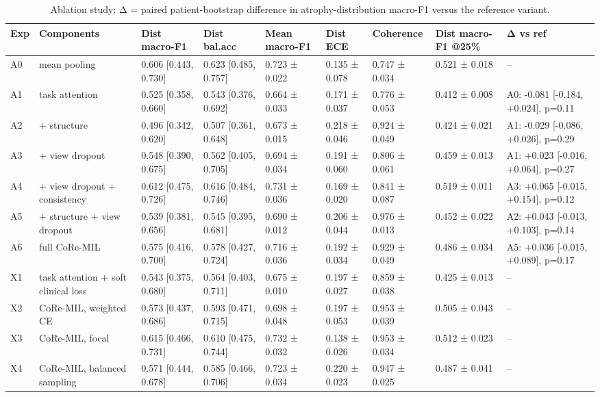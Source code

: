 \begin{table}
\caption{Ablation study; Δ = paired patient-bootstrap difference in atrophy-distribution macro-F1 versus the reference variant.}
\label{tab:table5_ablation}
\begin{tabular}{lllllllll}
\toprule
Exp & Components & Dist macro-F1 & Dist bal.acc & Mean macro-F1 & Dist ECE & Coherence & Dist macro-F1 @25\% & Δ vs ref \\
\midrule
A0 & mean pooling & 0.606 [0.443, 0.730] & 0.623 [0.485, 0.757] & 0.723 ± 0.022 & 0.135 ± 0.078 & 0.747 ± 0.034 & 0.521 ± 0.018 & -- \\
A1 & task attention & 0.525 [0.358, 0.660] & 0.543 [0.376, 0.692] & 0.664 ± 0.033 & 0.171 ± 0.037 & 0.776 ± 0.053 & 0.412 ± 0.008 & A0: -0.081 [-0.184, +0.024], p=0.11 \\
A2 & + structure & 0.496 [0.342, 0.620] & 0.507 [0.361, 0.648] & 0.673 ± 0.015 & 0.218 ± 0.046 & 0.924 ± 0.049 & 0.424 ± 0.021 & A1: -0.029 [-0.086, +0.026], p=0.29 \\
A3 & + view dropout & 0.548 [0.390, 0.675] & 0.562 [0.405, 0.705] & 0.694 ± 0.034 & 0.191 ± 0.060 & 0.806 ± 0.061 & 0.459 ± 0.013 & A1: +0.023 [-0.016, +0.064], p=0.27 \\
A4 & + view dropout + consistency & 0.612 [0.475, 0.726] & 0.616 [0.484, 0.746] & 0.731 ± 0.036 & 0.169 ± 0.020 & 0.841 ± 0.087 & 0.519 ± 0.011 & A3: +0.065 [-0.015, +0.154], p=0.12 \\
A5 & + structure + view dropout & 0.539 [0.381, 0.656] & 0.545 [0.395, 0.681] & 0.690 ± 0.012 & 0.206 ± 0.044 & 0.976 ± 0.013 & 0.452 ± 0.022 & A2: +0.043 [-0.013, +0.103], p=0.14 \\
A6 & full CoRe-MIL & 0.575 [0.416, 0.700] & 0.578 [0.427, 0.724] & 0.716 ± 0.036 & 0.192 ± 0.034 & 0.929 ± 0.049 & 0.486 ± 0.034 & A5: +0.036 [-0.015, +0.089], p=0.17 \\
X1 & task attention + soft clinical loss & 0.543 [0.375, 0.680] & 0.564 [0.403, 0.711] & 0.675 ± 0.010 & 0.197 ± 0.027 & 0.859 ± 0.038 & 0.425 ± 0.013 & -- \\
X2 & CoRe-MIL, weighted CE & 0.573 [0.437, 0.686] & 0.593 [0.471, 0.715] & 0.698 ± 0.048 & 0.197 ± 0.053 & 0.953 ± 0.039 & 0.505 ± 0.043 & -- \\
X3 & CoRe-MIL, focal & 0.615 [0.466, 0.731] & 0.610 [0.475, 0.744] & 0.732 ± 0.032 & 0.138 ± 0.026 & 0.953 ± 0.034 & 0.512 ± 0.023 & -- \\
X4 & CoRe-MIL, balanced sampling & 0.571 [0.444, 0.678] & 0.585 [0.466, 0.706] & 0.723 ± 0.034 & 0.220 ± 0.023 & 0.947 ± 0.025 & 0.487 ± 0.041 & -- \\

\end{tabular}
\end{table}
